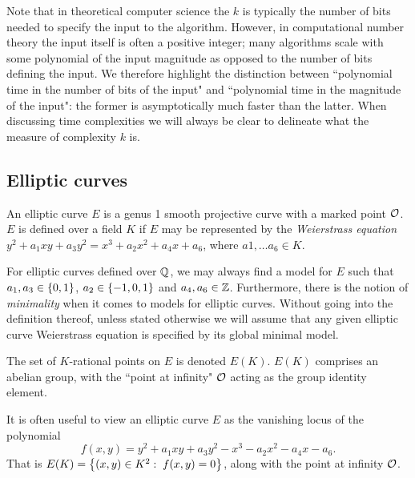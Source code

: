 Note that in theoretical computer science the $k$ is typically the number of bits needed to specify the input to the algorithm. However, in computational number theory the input itself is often a positive integer; many algorithms scale with some polynomial of the input magnitude as opposed to the number of bits defining the input. We therefore highlight the distinction between ``polynomial time in the number of bits of the input" and ``polynomial time in the magnitude of the input": the former is asymptotically much faster than the latter. When discussing time complexities we will always be clear to delineate what the measure of complexity $k$ is. \\



\subsection{Elliptic curves}

\begin{definition}
An elliptic curve $E$ is a genus 1 smooth projective curve with a marked point $\mathcal{O}$. $E$ is defined over a field $K$ if $E$ may be represented by the {\it Weierstrass equation} $y^2 + a_1 xy + a_3 y^2 = x^3 + a_2 x^2 + a_4 x + a_6$, where $a1,\ldots a_6 \in K$.
\end{definition}

For elliptic curves defined over $\mathbb{Q}$, we may always find a model for $E$ such that $a_1, a_3 \in \left\{0,1\right\}$, $a_2 \in \left\{-1,0,1\right\}$ and $a_4,a_6 \in \mathbb{Z}$. Furthermore, there is the notion of {\it minimality} when it comes to models for elliptic curves. Without going into the definition thereof, unless stated otherwise we will assume that any given elliptic curve Weierstrass equation is specified by its global minimal model.

\begin{definition}
The set of $K$-rational points on $E$ is denoted $E(K)$. $E(K)$ comprises an abelian group, with the ``point at infinity" $\mathcal{O}$ acting as the group identity element.
\end{definition}

It is often useful to view an elliptic curve $E$ as the vanishing locus of the polynomial
\begin{equation}\label{eqn:E_poly}
f(x,y) = y^2 + a_1 xy + a_3 y^2 - x^3 - a_2 x^2 - a_4 x - a_6.
\end{equation}
 That is $E(K) = \left\{(x,y) \in K^2: \; f(x,y) = 0\right\}$, along with the point at infinity $\mathcal{O}$. \\

